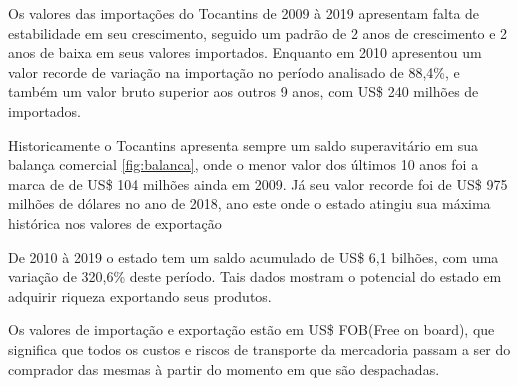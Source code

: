 \par Os valores das importações do Tocantins de 2009 à 2019 apresentam falta de estabilidade em seu crescimento, seguido um padrão de 2 anos de crescimento e 2 anos de baixa em seus valores importados. Enquanto em 2010 apresentou um valor recorde de variação na importação no período analisado de 88,4\%, e também um valor bruto superior aos outros 9 anos, com US\$ 240 milhões de importados.


\par Historicamente o Tocantins apresenta sempre um saldo superavitário em sua balança comercial \ref{fig:balanca}, onde o menor valor dos últimos 10 anos foi a marca de de US\$ 104 milhões ainda em 2009. Já seu valor recorde foi de US\$ 975 milhões de dólares no ano de 2018, ano este onde o estado atingiu sua máxima histórica nos valores de exportação

\par De 2010 à 2019 o estado tem um saldo acumulado de US\$ 6,1 bilhões, com uma variação de 320,6\% deste período. Tais dados mostram o potencial do estado em adquirir riqueza exportando seus produtos. 


\par Os valores de importação e exportação estão em US\$ FOB(Free on board), que significa que todos os custos e riscos de transporte da mercadoria passam a ser do comprador das mesmas à partir do momento em que são despachadas. 